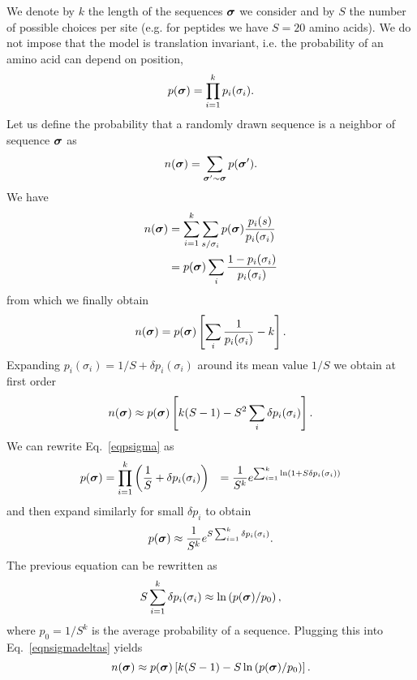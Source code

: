 We denote by $k$ the length of the sequences $\boldsymbol \sigma$ we consider and by $S$ the number of possible choices per site (e.g. for peptides we have $S=20$ amino acids). We do not impose that the model is translation invariant, i.e. the probability of an amino acid can depend on position,
\begin{equation} \label{eqpsigma}
    p(\boldsymbol \sigma) = \prod_{i=1}^k p_i(\sigma_i).
\end{equation}
Let us define the probability that a randomly drawn sequence is a neighbor of sequence $\boldsymbol \sigma$ as
\begin{equation}
    n(\boldsymbol \sigma) = \sum_{\boldsymbol \sigma' \sim \boldsymbol \sigma} p(\boldsymbol \sigma').
\end{equation}
We have 
\begin{align*}
    n(\boldsymbol \sigma) &= \sum_{i=1}^k \sum_{s / \sigma_i} p(\boldsymbol \sigma) \frac{p_i(s)}{p_i(\sigma_i)} \\
              &= p(\boldsymbol \sigma) \sum_i \frac{1-p_i(\sigma_i)}{p_i(\sigma_i)}
\end{align*}
from which we finally obtain
\begin{equation}
    n(\boldsymbol \sigma) = p(\boldsymbol \sigma) \left[\sum_i \frac{1}{p_i(\sigma_i)} - k\right].
\end{equation}
Expanding $p_i(\sigma_i) = 1/S + \delta p_i(\sigma_i)$ around its mean value $1/S$ we obtain at first order
\begin{equation} \label{eqnsigmadeltas}
    n(\boldsymbol \sigma) \approx p(\boldsymbol \sigma) \left[ k (S-1) - S^2 \sum_i \delta p_i(\sigma_i)\right].
\end{equation}
We can rewrite Eq.~\ref{eqpsigma} as
\begin{align}
    p(\boldsymbol \sigma) &= \prod_{i=1}^k \left(\frac{1}{S} + \delta p_i(\sigma_i) \right)
                 &= \frac{1}{S^k} e^{\sum_{i=1}^k \ln(1+ S \delta p_i(\sigma_i))}
\end{align}
and then expand similarly for small $\delta p_i$ to obtain
\begin{equation}
    p(\boldsymbol \sigma) \approx \frac{1}{S^k} e^{S \sum_{i=1}^k \delta p_i(\sigma_i)}.
\end{equation}
The previous equation can be rewritten as
\begin{equation*}
    S \sum_{i=1}^k \delta p_i(\sigma_i) \approx \ln\left(p(\boldsymbol \sigma)/p_0\right),
\end{equation*}
where $p_0 = 1/S^k$ is the average probability of a sequence.
Plugging this into Eq.~\ref{eqnsigmadeltas} yields
\begin{equation} 
    n(\boldsymbol \sigma) \approx p(\boldsymbol \sigma) \left[ k (S-1) - S \ln\left(p(\boldsymbol \sigma)/p_0\right)\right].
\end{equation}

